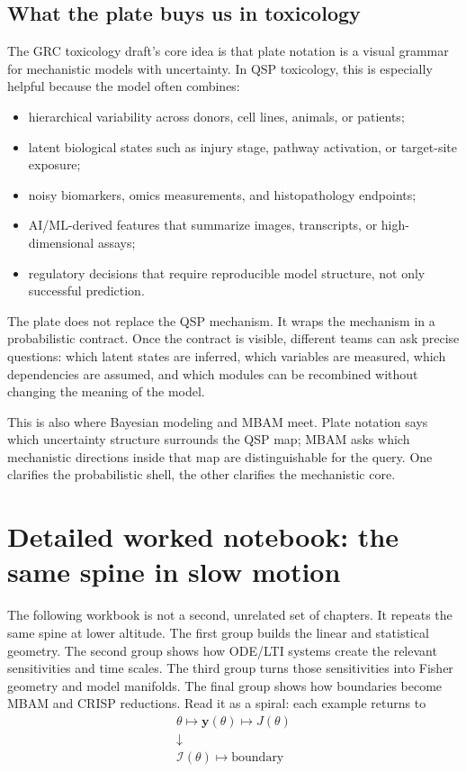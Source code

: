 \documentclass[a4paper]{article}
\newcommand{\vect}[1]{\mathbf{#1}}
\newcommand{\param}{\theta}
\newcommand{\fim}{\mathcal{I}}
\newcommand{\jac}{J}
\begin{document}
\subsection{What the plate buys us in toxicology}

The GRC toxicology draft's core idea is that plate notation is a visual grammar for mechanistic models with uncertainty.  In QSP toxicology, this is especially helpful because the model often combines:
\begin{itemize}[leftmargin=2em]
  \item hierarchical variability across donors, cell lines, animals, or patients;
  \item latent biological states such as injury stage, pathway activation, or target-site exposure;
  \item noisy biomarkers, omics measurements, and histopathology endpoints;
  \item AI/ML-derived features that summarize images, transcripts, or high-dimensional assays;
  \item regulatory decisions that require reproducible model structure, not only successful prediction.
\end{itemize}
The plate does not replace the QSP mechanism.  It wraps the mechanism in a probabilistic contract.  Once the contract is visible, different teams can ask precise questions: which latent states are inferred, which variables are measured, which dependencies are assumed, and which modules can be recombined without changing the meaning of the model.

\begin{remark}
  This is also where Bayesian modeling and MBAM meet.  Plate notation says which uncertainty structure surrounds the QSP map; MBAM asks which mechanistic directions inside that map are distinguishable for the query.  One clarifies the probabilistic shell, the other clarifies the mechanistic core.
\end{remark}

\section{Detailed worked notebook: the same spine in slow motion}

The following workbook is not a second, unrelated set of chapters.  It repeats the same spine at lower altitude.  The first group builds the linear and statistical geometry.  The second group shows how ODE/LTI systems create the relevant sensitivities and time scales.  The third group turns those sensitivities into Fisher geometry and model manifolds.  The final group shows how boundaries become MBAM and CRISP reductions.  Read it as a spiral: each example returns to
\[
  \begin{array}{c}
    \param\longmapsto\vect{y}(\param)\longmapsto\jac(\param)\\
    \downarrow\\
    \fim(\param)\longmapsto\text{boundary}
  \end{array}
\]
\end{document}
